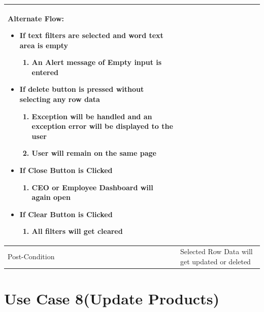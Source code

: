 \documentclass[12pt,a4paper]{report}
\begin{document}
\begin{tabular}{ | m{3cm} | m{12cm}| }
Alternate Flow:

\begin{itemize}
\item If text filters are selected and word text area is empty
	\begin{enumerate}
		\item An Alert message of Empty input is entered
	\end{enumerate}
\item If delete button is pressed without selecting any row data
	\begin{enumerate}
	   	 \item	Exception will be handled and an exception error will be displayed to the user
	   	 \item User will remain on the same page 
	\end{enumerate}
\item If Close Button is Clicked
	\begin{enumerate}
		\item CEO or Employee Dashboard will again open
	\end{enumerate}
\item If Clear Button is Clicked
	\begin{enumerate}
		\item All filters will get cleared
	\end{enumerate}
\end{itemize}
\\ \hline
Post-Condition &  Selected Row Data will get updated or deleted  \\ \hline

\end{tabular}
\section{Use Case 8(Update Products) }
\end{document}
